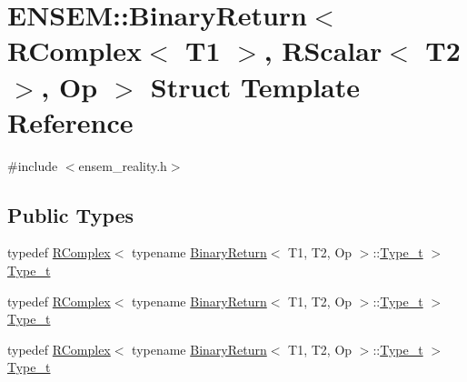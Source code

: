 \hypertarget{structENSEM_1_1BinaryReturn_3_01RComplex_3_01T1_01_4_00_01RScalar_3_01T2_01_4_00_01Op_01_4}{}\section{E\+N\+S\+EM\+:\+:Binary\+Return$<$ R\+Complex$<$ T1 $>$, R\+Scalar$<$ T2 $>$, Op $>$ Struct Template Reference}
\label{structENSEM_1_1BinaryReturn_3_01RComplex_3_01T1_01_4_00_01RScalar_3_01T2_01_4_00_01Op_01_4}


{\ttfamily \#include $<$ensem\+\_\+reality.\+h$>$}

\subsection*{Public Types}
\begin{DoxyCompactItemize}
\item 
typedef \mbox{\hyperlink{classENSEM_1_1RComplex}{R\+Complex}}$<$ typename \mbox{\hyperlink{structENSEM_1_1BinaryReturn}{Binary\+Return}}$<$ T1, T2, Op $>$\+::\mbox{\hyperlink{structENSEM_1_1BinaryReturn_3_01RComplex_3_01T1_01_4_00_01RScalar_3_01T2_01_4_00_01Op_01_4_a6791a00faf5cae0c8af51e11a7193897}{Type\+\_\+t}} $>$ \mbox{\hyperlink{structENSEM_1_1BinaryReturn_3_01RComplex_3_01T1_01_4_00_01RScalar_3_01T2_01_4_00_01Op_01_4_a6791a00faf5cae0c8af51e11a7193897}{Type\+\_\+t}}
\item 
typedef \mbox{\hyperlink{classENSEM_1_1RComplex}{R\+Complex}}$<$ typename \mbox{\hyperlink{structENSEM_1_1BinaryReturn}{Binary\+Return}}$<$ T1, T2, Op $>$\+::\mbox{\hyperlink{structENSEM_1_1BinaryReturn_3_01RComplex_3_01T1_01_4_00_01RScalar_3_01T2_01_4_00_01Op_01_4_a6791a00faf5cae0c8af51e11a7193897}{Type\+\_\+t}} $>$ \mbox{\hyperlink{structENSEM_1_1BinaryReturn_3_01RComplex_3_01T1_01_4_00_01RScalar_3_01T2_01_4_00_01Op_01_4_a6791a00faf5cae0c8af51e11a7193897}{Type\+\_\+t}}
\item 
typedef \mbox{\hyperlink{classENSEM_1_1RComplex}{R\+Complex}}$<$ typename \mbox{\hyperlink{structENSEM_1_1BinaryReturn}{Binary\+Return}}$<$ T1, T2, Op $>$\+::\mbox{\hyperlink{structENSEM_1_1BinaryReturn_3_01RComplex_3_01T1_01_4_00_01RScalar_3_01T2_01_4_00_01Op_01_4_a6791a00faf5cae0c8af51e11a7193897}{Type\+\_\+t}} $>$ \mbox{\hyperlink{structENSEM_1_1BinaryReturn_3_01RComplex_3_01T1_01_4_00_01RScalar_3_01T2_01_4_00_01Op_01_4_a6791a00faf5cae0c8af51e11a7193897}{Type\+\_\+t}}
\end{DoxyCompactItemize}


